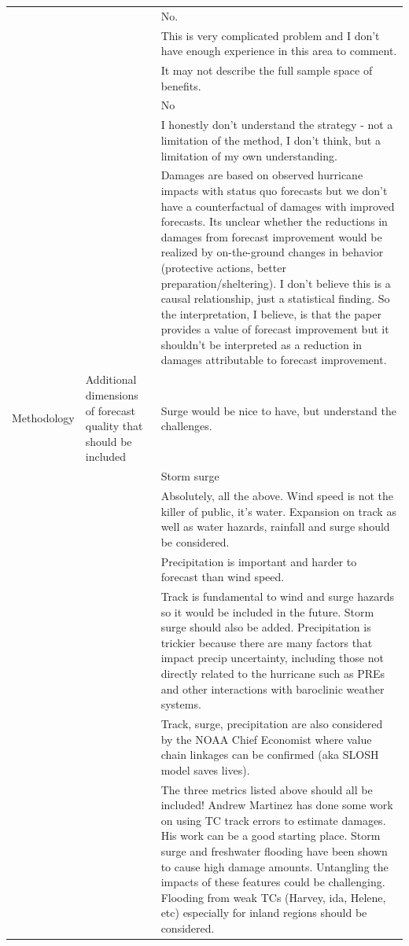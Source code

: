 \begin{longtable}[t]{lp{4.2cm}p{8.2cm}}
 &  & No.\\
 &  & This is very complicated problem and I don't have enough experience in this area to comment.\\
 &  & It may not describe the full sample space of benefits.\\
 &  & No\\
 &  & I honestly don't understand the strategy - not a limitation of the method, I don't think, but a limitation of my own understanding.\\
\addlinespace
 &  & Damages are based on observed hurricane impacts with status quo forecasts but we don't have a counterfactual of damages with improved forecasts. Its unclear whether the reductions in damages from forecast improvement would be realized by on-the-ground changes in behavior (protective actions, better preparation/sheltering). I don't believe this is a causal relationship, just a statistical finding. So the interpretation, I believe, is that the paper provides a value of forecast improvement but it shouldn't be interpreted as a reduction in damages attributable to forecast improvement.\\
Methodology & Additional dimensions of forecast quality that should be included & Surge would be nice to have, but understand the challenges.\\
 &  & Storm surge\\
 &  & Absolutely, all the above. Wind speed is not the killer of public, it's water. Expansion on track as well as water hazards, rainfall and surge should be considered.\\
 &  & Precipitation is important and harder to forecast than wind speed.\\
\addlinespace
 &  & Track is fundamental to wind and surge hazards so it would be included in the future. Storm surge should also be added. Precipitation is trickier because there are many factors that impact precip uncertainty, including those not directly related to the hurricane such as PREs and other interactions with baroclinic weather systems.\\
 &  & Track, surge, precipitation are also considered by the NOAA Chief Economist where value chain linkages can be confirmed (aka SLOSH model saves lives).\\
 &  & The three metrics listed above should all be included! Andrew Martinez has done some work on using TC track errors to estimate damages. His work can be a good starting place. Storm surge and freshwater flooding have been shown to cause high damage amounts. Untangling the impacts of these features could be challenging. Flooding from weak TCs (Harvey, ida, Helene, etc) especially  for inland regions should be considered.\\

\end{longtable}
